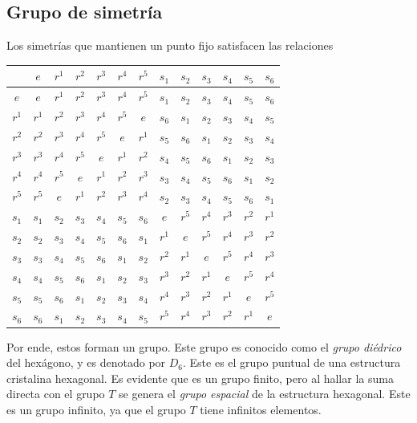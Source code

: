 \subsection{Grupo de simetría}
Los simetrías que mantienen un punto fijo satisfacen las relaciones
\begin{table}[!httb]
  \centering
  \begin{tabular}{|c | c c c c c c c c c c c c|}
    \hline
     & $e$ & $r^1$ & $r^2$ & $r^3$ & $r^4$ & $r^5$ & $s_1$ & $s_2$ & $s_3$ & $s_4$ & $s_5$ & $s_6$\\\hline
  $e$  & $e$ & $r^1$ & $r^2$ & $r^3$ & $r^4$ & $r^5$ & $s_1$ & $s_2$ & $s_3$ & $s_4$ & $s_5$ & $s_6$\\
  $r^1$ & $r^1$ & $r^2$ & $r^3$ & $r^4$ & $r^5$ & $e$ & $s_6$ & $s_1$ & $s_2$ & $s_3$ & $s_4$ & $s_5$\\
  $r^2$ & $r^2$ & $r^3$ & $r^4$ & $r^5$ & $e$ & $r^1$ & $s_5$ & $s_6$ & $s_1$ & $s_2$ & $s_3$ & $s_4$\\
  $r^3$ & $r^3$ & $r^4$ & $r^5$ & $e$ & $r^1$ & $r^2$ & $s_4$ & $s_5$ & $s_6$ & $s_1$ & $s_2$ & $s_3$\\
  $r^4$ & $r^4$ & $r^5$ & $e$ & $r^1$ & $r^2$ & $r^3$ & $s_3$ & $s_4$ & $s_5$ & $s_6$ & $s_1$ & $s_2$\\
  $r^5$ & $r^5$ & $e$ & $r^1$ & $r^2$ & $r^3$ & $r^4$ & $s_2$ & $s_3$ & $s_4$ & $s_5$ & $s_6$ & $s_1$\\
  $s_1$ & $s_1$ & $s_2$ & $s_3$ & $s_4$ & $s_5$ & $s_6$ & $e$ & $r^5$ & $r^4$ & $r^3$ & $r^2$ & $r^1$\\
  $s_2$ & $s_2$ & $s_3$ & $s_4$ & $s_5$ & $s_6$ & $s_1$ & $r^1$ & $e$ & $r^5$ & $r^4$ & $r^3$ & $r^2$\\
  $s_3$ & $s_3$ & $s_4$ & $s_5$ & $s_6$ & $s_1$ & $s_2$ & $r^2$ & $r^1$ & $e$ & $r^5$ & $r^4$ & $r^3$\\
  $s_4$ & $s_4$ & $s_5$ & $s_6$ & $s_1$ & $s_2$ & $s_3$ & $r^3$ & $r^2$ & $r^1$ & $e$ & $r^5$ & $r^4$\\
  $s_5$ & $s_5$ & $s_6$ & $s_1$ & $s_2$ & $s_3$ & $s_4$ & $r^4$ & $r^3$ & $r^2$ & $r^1$ & $e$ & $r^5$\\
  $s_6$ & $s_6$ & $s_1$ & $s_2$ & $s_3$ & $s_4$ & $s_5$ & $r^5$ & $r^4$ & $r^3$ & $r^2$ & $r^1$ & $e$\\\hline
  \end{tabular}
\end{table}

Por ende, estos forman un grupo. Este grupo es conocido como el \emph{grupo diédrico} del hexágono, y es denotado por $D_6$. Este es el grupo puntual de una estructura cristalina hexagonal. Es evidente que es un grupo finito, pero al hallar la suma directa con el grupo $T$ se genera el \emph{grupo espacial} de la estructura hexagonal. Este es un grupo infinito, ya que el grupo $T$ tiene infinitos elementos.
